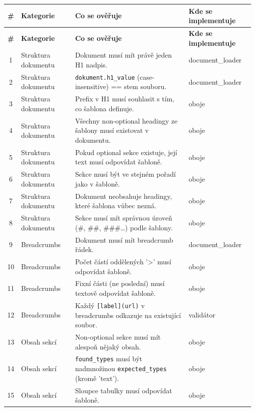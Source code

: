 \documentclass[12pt, a4paper]{article}
\begin{document}
\renewcommand{\arraystretch}{1.25}
\begin{small}
\begin{longtable}{|c|p{3.0cm}|p{8.5cm}|p{2.5cm}|}
\hline
\textbf{\#} & \textbf{Kategorie} & \textbf{Co se ověřuje} & \textbf{Kde se implementuje} \\
\hline
\endfirsthead
\hline
\textbf{\#} & \textbf{Kategorie} & \textbf{Co se ověřuje} & \textbf{Kde se implementuje} \\
\hline
\endhead

1 & Struktura dokumentu & Dokument musí mít právě jeden H1 nadpis. & document\_loader \\ \hline
2 & Struktura dokumentu & \texttt{dokument.h1\_value} (case-insensitive) == stem souboru. & document\_loader \\ \hline
3 & Struktura dokumentu & Prefix v H1 musí souhlasit s tím, co šablona definuje. & oboje \\ \hline
4 & Struktura dokumentu & Všechny non-optional headingy ze šablony musí existovat v dokumentu. & oboje \\ \hline
5 & Struktura dokumentu & Pokud optional sekce existuje, její text musí odpovídat šabloně. & oboje \\ \hline
6 & Struktura dokumentu & Sekce musí být ve stejném pořadí jako v šabloně. & oboje \\ \hline
7 & Struktura dokumentu & Dokument neobsahuje headingy, které šablona vůbec nezná. & oboje \\ \hline
8 & Struktura dokumentu & Sekce musí mít správnou úroveň (\#, \#\#, \#\#\#\ldots) podle šablony. & oboje \\ \hline
9 & Breadcrumbs & Dokument musí mít breadcrumb řádek. & document\_loader \\ \hline
10 & Breadcrumbs & Počet částí oddělených '>' musí odpovídat šabloně. & oboje \\ \hline
11 & Breadcrumbs & Fixní části (ne poslední) musí textově odpovídat šabloně. & oboje \\ \hline
12 & Breadcrumbs & Každý \texttt{[label](url)} v breadcrumbs odkazuje na existující soubor. & validátor \\ \hline
13 & Obsah sekcí & Non-optional sekce musí mít alespoň nějaký obsah. & oboje \\ \hline
14 & Obsah sekcí & \texttt{found\_types} musí být nadmnožinou \texttt{expected\_types} (kromě 'text'). & oboje \\ \hline
15 & Obsah sekcí & Sloupce tabulky musí odpovídat šabloně. & oboje \\ \hline

\end{longtable}
\end{small}
\end{document}

